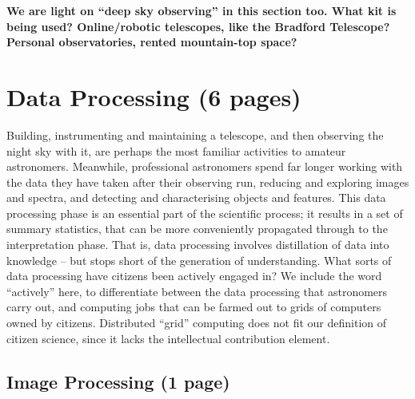 \documentclass{ar2e}
\begin{document}
{\bf We are light on ``deep sky observing'' in this section too. What kit is
being used? Online/robotic telescopes, like the Bradford Telescope? Personal
observatories, rented mountain-top space?}



\section{Data Processing (6 pages)}
\label{sec:class}

Building, instrumenting and maintaining a telescope, and then observing the
night sky with it, are perhaps the most familiar activities to amateur
astronomers. Meanwhile, professional astronomers spend far longer working with
the data they have taken after their observing run, reducing and exploring
images and spectra, and detecting and characterising objects and features. This
data processing phase is an essential part of the scientific process; it results
in a set of summary statistics, that can be more
conveniently propagated through to the interpretation phase. That is, data
processing involves distillation of data into knowledge -- but stops short of
the generation of understanding. What sorts of data processing have citizens
been actively engaged in? We include the word ``actively'' here, to
differentiate between the data processing that astronomers carry out, and 
computing jobs that can be farmed out to grids of computers owned by citizens.
Distributed ``grid'' computing does not fit our definition of citizen science, 
since it lacks the intellectual contribution element.



\subsection{Image Processing (1 page)}
\label{sec:class:non-sensory}
\end{document}
